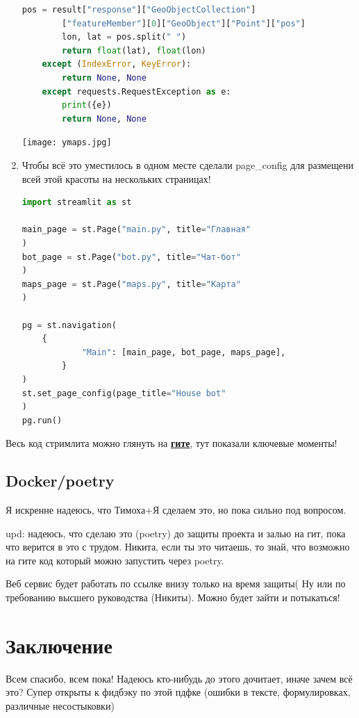 \documentclass{article}
\begin{document}
\begin{enumerate}
\begin{lstlisting}[language=Python]
        pos = result["response"]["GeoObjectCollection"]
        ["featureMember"][0]["GeoObject"]["Point"]["pos"]
        lon, lat = pos.split(" ")
        return float(lat), float(lon)
    except (IndexError, KeyError):
        return None, None  
    except requests.RequestException as e:
        print({e})
        return None, None
        \end{lstlisting}

    \texttt{[image: ymaps.jpg]}

    \item Чтобы всё это уместилось в одном месте сделали page\_config для размещени всей этой красоты на нескольких страницах!
        \begin{lstlisting}[language=Python]
import streamlit as st

main_page = st.Page("main.py", title="Главная"
)
bot_page = st.Page("bot.py", title="Чат-бот"
)
maps_page = st.Page("maps.py", title="Карта"
)

pg = st.navigation(
    {
            "Main": [main_page, bot_page, maps_page],
        }
)
st.set_page_config(page_title="House bot"
)
pg.run()
        \end{lstlisting}
\end{enumerate}


Весь код стримлита можно глянуть на \textbf{\href{https://github.com/Y1OV/rag4rent}{гите}}, тут показали ключевые моменты!

\subsection{Docker/poetry}

Я искренне надеюсь, что Тимоха+Я сделаем это, но пока сильно под вопросом.

upd:
надеюсь, что сделаю это (poetry) до защиты проекта и залью на гит, пока что верится в это с трудом. Никита, если ты это читаешь, то знай, что возможно на гите код который можно запустить через poetry.


Веб сервис будет работать по ссылке внизу только на время защиты( Ну или по требованию высшего руководства (Никиты). Можно будет зайти и потыкаться! 


\newpage

\section{Заключение}


Всем спасибо, всем пока! Надеюсь кто-нибудь до этого дочитает, иначе зачем всё это? Супер открыты к фидбэку по этой пдфке (ошибки в тексте, формулировках, различные несостыковки)
\end{document}
